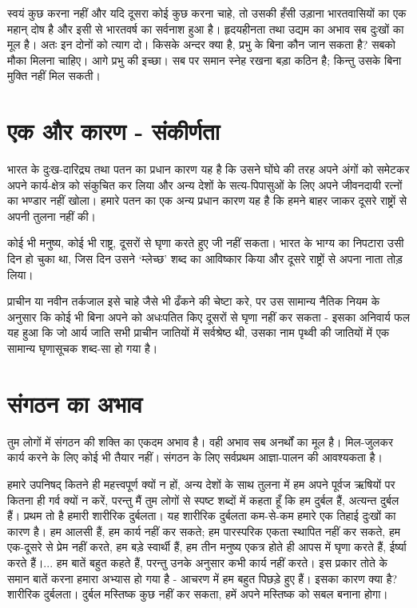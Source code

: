 स्वयं कुछ करना नहीं और यदि दूसरा कोई कुछ करना चाहे, तो उसकी हँसी उड़ाना भारतवासियों का एक महान् दोष है और इसी से भारतवर्ष का सर्वनाश हुआ है। हृदयहीनता तथा उद्यम का अभाव सब दुःखों का मूल है। अतः इन दोनों को त्याग दो। किसके अन्दर क्या है, प्रभु के बिना कौन जान सकता है? सबको मौका मिलना चाहिए। आगे प्रभु की इच्छा। सब पर समान स्नेह रखना बड़ा कठिन है; किन्तु उसके बिना मुक्ति नहीं मिल सकती।


\section*{एक और कारण - संकीर्णता}


भारत के दुःख-दारिद्र्य तथा पतन का प्रधान कारण यह है कि उसने घोंघे की तरह अपने अंगों को समेटकर अपने कार्य-क्षेत्र को संकुचित कर लिया और अन्य देशों के सत्य-पिपासुओं के लिए अपने जीवनदायी रत्नों का भण्डार नहीं खोला। हमारे पतन का एक अन्य प्रधान कारण यह है कि हमने बाहर जाकर दूसरे राष्ट्रों से अपनी तुलना नहीं की। 

कोई भी मनुष्य, कोई भी राष्ट्र, दूसरों से घृणा करते हुए जी नहीं सकता। भारत के भाग्य का निपटारा उसी दिन हो चुका था, जिस दिन उसने ‘म्लेच्छ’ शब्द का आविष्कार किया और दूसरे राष्ट्रों से अपना नाता तोड़ लिया। 

\vskip 3pt

प्राचीन या नवीन तर्कजाल इसे चाहे जैसे भी ढँकने की चेष्टा करे, पर उस सामान्य नैतिक नियम के अनुसार कि कोई भी बिना अपने को अधःपतित किए दूसरों से घृणा नहीं कर सकता - इसका अनिवार्य फल यह हुआ कि जो आर्य जाति सभी प्राचीन जातियों में सर्वश्रेष्ठ थी, उसका नाम पृथ्वी की जातियों में एक सामान्य घृणासूचक शब्द-सा हो गया है। 

\vskip 2pt


\section*{संगठन का अभाव}


तुम लोगों में संगठन की शक्ति का एकदम अभाव है। वही अभाव सब अनर्थों का मूल है। मिल-जुलकर कार्य करने के लिए कोई भी तैयार नहीं। संगठन के लिए सर्वप्रथम आज्ञा-पालन की आवश्यकता है। 

\vskip 3pt

हमारे उपनिषद् कितने ही महत्त्वपूर्ण क्यों न हों, अन्य देशों के साथ तुलना में हम अपने पूर्वज ऋषियों पर कितना ही गर्व क्यों न करें, परन्तु मैं तुम लोगों से स्पष्ट शब्दों में कहता हूँ कि हम दुर्बल हैं, अत्यन्त दुर्बल हैं। प्रथम तो है हमारी शारीरिक दुर्बलता। यह शारीरिक दुर्बलता कम-से-कम हमारे एक तिहाई दुःखों का कारण है। हम आलसी हैं, हम कार्य नहीं कर सकते; हम पारस्परिक एकता स्थापित नहीं कर सकते, हम एक-दूसरे से प्रेम नहीं करते, हम बड़े स्वार्थी हैं, हम तीन मनुष्य एकत्र होते ही आपस में घृणा करते हैं, ईर्ष्या करते हैं।... हम बातें बहुत कहते हैं, परन्तु उनके अनुसार कभी कार्य नहीं करते। इस प्रकार तोते के समान बातें करना हमारा अभ्यास हो गया है - आचरण में हम बहुत पिछड़े हुए हैं। इसका कारण क्या है? शारीरिक दुर्बलता। दुर्बल मस्तिष्क कुछ नहीं कर सकता, हमें अपने मस्तिष्क को सबल बनाना होगा। 

